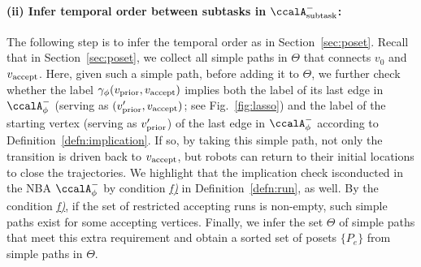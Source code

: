 \documentclass[Afour,sageh,times]{sagej}
\newcommand{\auto}[1]{\ccalA_{\textup{#1}}}
\newcommand{\autop}{\ccalA_{\phi}}
\newcommand{\vertex}[1]{v_{\textup{#1}}}
\newcommand{\ag}[2]{\langle#1,#2\rangle}
\begin{document}
{{{  \paragraph{(ii) Infer temporal order between subtasks in $\auto{subtask}^-$:}The following step is to infer the temporal order as in Section~\ref{sec:poset}. Recall that in Section~\ref{sec:poset}, we collect all simple paths in $\Theta$ that connects $v_0$ and $\vertex{accept}$. Here, given such a simple path, before adding it to $\Theta$, we further check whether the label $\gamma_\phi(\vertex{prior}, \vertex{accept})$ implies both  the label of its last edge in $\autop^-$ (serving as $(\vertex{prior}', \vertex{accept})$; see Fig.~\ref{fig:lasso}) and the label of the starting vertex (serving as $\vertex{prior}'$) of the last edge  in $\autop^-$ according to Definition~\ref{defn:implication}.
  If so, by taking this simple path, not only the transition is driven back to $\vertex{accept}$, but robots can return to their initial locations to close the trajectories. %
  We highlight that the implication check isconducted in the NBA $\autop^-$ by condition \hyperref[cond:f]{\it f)} in Definition~\ref{defn:run}, as well. By the condition \hyperref[cond:f]{\it f)}, if the set of restricted accepting runs is non-empty, such simple paths exist for some accepting vertices. Finally, we infer the set $\Theta$ of simple paths that meet this extra requirement and  obtain a sorted set of posets $\{P_e\}$ from simple paths in $\Theta$.

}}}
\end{document}
